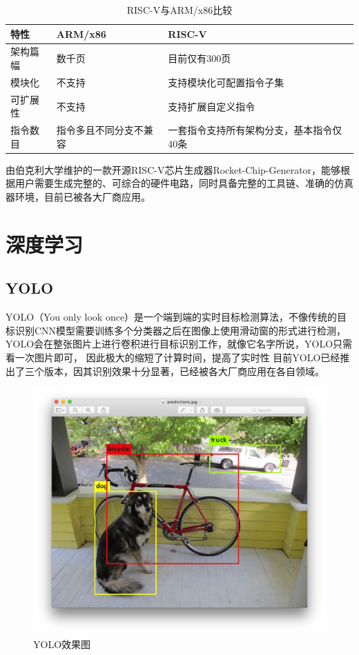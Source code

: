     \begin{table}[h] %
        \centering
        \caption{RISC-V与ARM/x86比较} %
        \begin{tabular}{l|l|l} %
        \hline  
        特性 & ARM/x86 & RISC-V \\
        \hline %
        架构篇幅 & 数千页  & 目前仅有300页 \\
        \hline  
        模块化 & 不支持  & 支持模块化可配置指令子集 \\
        \hline  
        可扩展性 & 不支持 & 支持扩展自定义指令 \\
        \hline  
        指令数目 & 指令多且不同分支不兼容 & 一套指令支持所有架构分支，基本指令仅40条 \\
        \hline  
        \end{tabular}  
    \end{table}

    由伯克利大学维护的一款开源RISC-V芯片生成器Rocket-Chip-Generator，能够根据用户需要生成完整的、可综合的硬件电路，同时具备完整的工具链、准确的仿真器环境，目前已被各大厂商应用。


\section{深度学习}
    \subsection{YOLO}
    YOLO（You only look once）是一个端到端的实时目标检测算法，不像传统的目标识别CNN模型需要训练多个分类器之后在图像上使用滑动窗的形式进行检测，YOLO会在整张图片上进行卷积进行目标识别工作，就像它名字所说，YOLO只需看一次图片即可，
    因此极大的缩短了计算时间，提高了实时性
    目前YOLO已经推出了三个版本，因其识别效果十分显著，已经被各大厂商应用在各自领域。
    \begin{figure}[h]
        \centering
        \includegraphics[scale=0.2]{../pdf/yolo.png}
        \caption{YOLO效果图}
        \label{}
    \end{figure}
